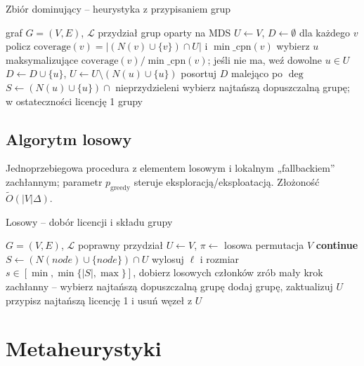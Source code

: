 \begin{algorithm}[H]
\caption{Zbiór dominujący – heurystyka z przypisaniem grup}
\label{alg:ds}
\begin{algorithmic}[1]
\Require graf $G=(V,E)$, $\mathcal{L}$
\Ensure przydział grup oparty na MDS
\State $U\gets V$, $D\gets\emptyset$
  \State dla każdego $v$ policz $\mathrm{coverage}(v)=|(N(v)\cup\{v\})\cap U|$ i $\min\_\mathrm{cpn}(v)$
  \State wybierz $u$ maksymalizujące $\mathrm{coverage}(v)/\min\_\mathrm{cpn}(v)$; jeśli nie ma, weź dowolne $u\in U$
  \State $D\gets D\cup\{u\}$, $U\gets U\setminus(N(u)\cup\{u\})$
\EndWhile
\State posortuj $D$ malejąco po $\deg$
  \State $S\gets(N(u)\cup\{u\})\cap$ nieprzydzieleni
  \State wybierz najtańszą dopuszczalną grupę; w ostateczności licencję 1
\EndFor
\State \Return grupy
\end{algorithmic}
\end{algorithm}

\subsection{Algorytm losowy}

Jednoprzebiegowa procedura z elementem losowym i lokalnym „fallbackiem” zachłannym; parametr $p_{\mathrm{greedy}}$ steruje eksploracją/eksploatacją. Złożoność $\tilde O(|V|\Delta)$.

\begin{algorithm}[H]
\caption{Losowy – dobór licencji i składu grupy}
\label{alg:randomized}
\begin{algorithmic}[1]
\Require $G=(V,E)$, $\mathcal{L}$
\Ensure poprawny przydział
\State $U\gets V$, $\pi\gets$ losowa permutacja $V$
   \textbf{continue}\EndIf
  \State $S\gets(N(node)\cup\{node\})\cap U$
    \State wylosuj $\ell$ i rozmiar $s\in[\min,\min\{|S|,\max\}]$, dobierz losowych członków
  \Else
    \State zrób mały krok zachłanny – wybierz najtańszą dopuszczalną grupę
  \EndIf
  \State dodaj grupę, zaktualizuj $U$
\EndFor
{} przypisz najtańszą licencję 1 i usuń węzeł z $U$ \EndWhile
\end{algorithmic}
\end{algorithm}

\section{Metaheurystyki}

